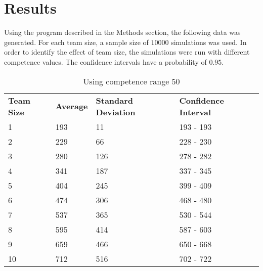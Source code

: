\documentclass[12pt]{article}
\begin{document}
\section{Results}
Using the program described in the Methods section, the following data was generated.
For each team size, a sample size of $10000$ simulations was used. In order to identify the effect of team size, the simulations were run with different competence values. The confidence intervals have a probability of $0.95$.

\begin{table}[!htb]
	\centering
	\caption{Using competence range 50}
	\begin{tabular}{llll}
		\textbf{Team Size} & \textbf{Average} & \textbf{Standard Deviation} & \textbf{Confidence Interval} \\
		1                  & 193              & 11                          & 193 - 193                    \\
		2                  & 229              & 66                          & 228 - 230                    \\
		3                  & 280              & 126                         & 278 - 282                    \\
		4                  & 341              & 187                         & 337 - 345                    \\
		5                  & 404              & 245                         & 399 - 409                    \\
		6                  & 474              & 306                         & 468 - 480                    \\
		7                  & 537              & 365                         & 530 - 544                    \\
		8                  & 595              & 414                         & 587 - 603                    \\
		9                  & 659              & 466                         & 650 - 668                    \\
		10                 & 712              & 516                         & 702 - 722                   
	\end{tabular}
\end{table}
\end{document}
